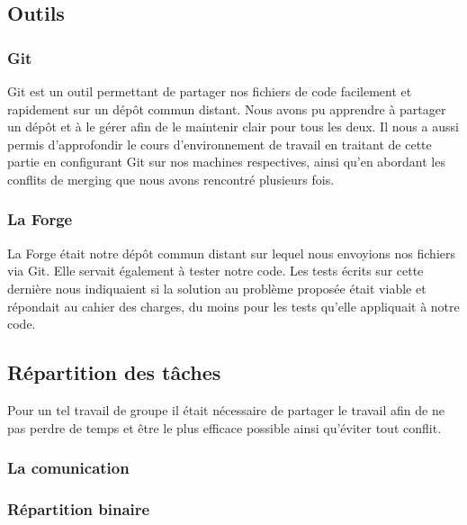 \documentclass{article}
\begin{document}
\subsection{Outils}



\subsubsection{Git}

\hspace{1em}Git est un outil permettant de partager nos fichiers de code facilement et rapidement sur un dépôt commun distant. Nous avons pu apprendre à partager un dépôt et à le gérer afin de le maintenir clair pour tous les deux. Il nous a aussi permis d'approfondir le cours d'environnement de travail  en traitant de cette partie en configurant Git sur nos machines respectives, ainsi qu'en abordant les conflits de merging que nous avons rencontré plusieurs fois. 

\subsubsection{La Forge}

\hspace{1em} La Forge était notre dépôt commun distant sur lequel nous envoyions nos fichiers via Git. Elle servait également à tester notre code. Les tests écrits sur cette dernière nous indiquaient si la solution au problème proposée était viable et répondait au cahier des charges, du moins pour les tests qu'elle appliquait à notre code.

\subsection{Répartition des tâches}

\hspace{1em} Pour un tel travail de groupe il était nécessaire de partager le travail afin de ne pas perdre de temps et être le plus efficace possible ainsi qu'éviter tout conflit.  

\subsubsection{La comunication}


\subsubsection{Répartition binaire}
\end{document}

